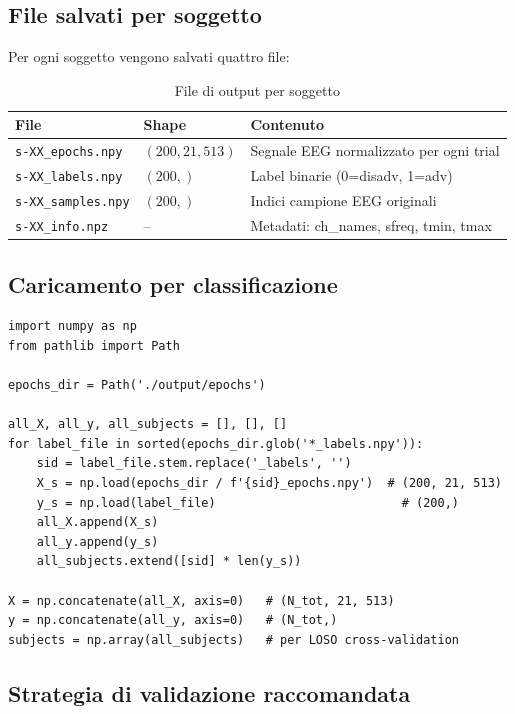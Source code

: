 \documentclass[12pt, a4paper]{article}
\begin{document}
\subsection{File salvati per soggetto}

Per ogni soggetto vengono salvati quattro file:

\begin{table}[h!]
\centering
\caption{File di output per soggetto}
\begin{tabular}{lll}
\toprule
\textbf{File} & \textbf{Shape} & \textbf{Contenuto} \\
\midrule
\texttt{s-XX\_epochs.npy} & $(200, 21, 513)$ & Segnale EEG normalizzato per ogni trial \\
\texttt{s-XX\_labels.npy} & $(200,)$ & Label binarie (0=disadv, 1=adv) \\
\texttt{s-XX\_samples.npy} & $(200,)$ & Indici campione EEG originali \\
\texttt{s-XX\_info.npz} & -- & Metadati: ch\_names, sfreq, tmin, tmax \\
\bottomrule
\end{tabular}
\end{table}

\subsection{Caricamento per classificazione}

\begin{lstlisting}[caption={Caricamento del dataset completo per ML}]
import numpy as np
from pathlib import Path

epochs_dir = Path('./output/epochs')

all_X, all_y, all_subjects = [], [], []
for label_file in sorted(epochs_dir.glob('*_labels.npy')):
    sid = label_file.stem.replace('_labels', '')
    X_s = np.load(epochs_dir / f'{sid}_epochs.npy')  # (200, 21, 513)
    y_s = np.load(label_file)                          # (200,)
    all_X.append(X_s)
    all_y.append(y_s)
    all_subjects.extend([sid] * len(y_s))

X = np.concatenate(all_X, axis=0)   # (N_tot, 21, 513)
y = np.concatenate(all_y, axis=0)   # (N_tot,)
subjects = np.array(all_subjects)   # per LOSO cross-validation
\end{lstlisting}

\subsection{Strategia di validazione raccomandata}
\end{document}
